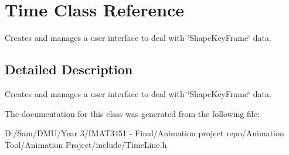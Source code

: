 \hypertarget{class_time}{}\section{Time Class Reference}
\label{class_time}


Creates and manages a user interface to deal with \char`\"{}\+Shape\+Key\+Frame\char`\"{} data.  




\subsection{Detailed Description}
Creates and manages a user interface to deal with \char`\"{}\+Shape\+Key\+Frame\char`\"{} data. 

The documentation for this class was generated from the following file\+:\begin{DoxyCompactItemize}
\item 
D\+:/\+Sam/\+D\+M\+U/\+Year 3/\+I\+M\+A\+T3451 -\/ Final/\+Animation project repo/\+Animation Tool/\+Animation Project/include/Time\+Line.\+h\end{DoxyCompactItemize}
